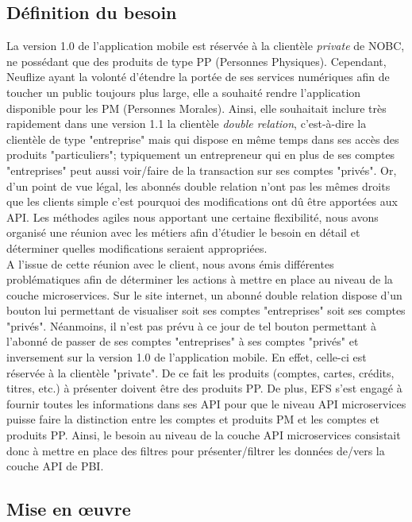\subsection{Définition du besoin}	
	
	La version 1.0 de l’application mobile est réservée à la clientèle \textit{private} de NOBC, ne possédant que des produits de type PP (Personnes Physiques). Cependant, Neuflize ayant la volonté d'étendre la portée de ses services numériques afin de toucher un public toujours plus large, elle a souhaité rendre l'application disponible pour les PM (Personnes Morales). Ainsi, elle souhaitait inclure très rapidement dans une version 1.1 la clientèle \textit{double relation}, c’est-à-dire la clientèle de type "entreprise" mais qui dispose en même temps dans ses accès des produits "particuliers"; typiquement un entrepreneur qui en plus de ses comptes "entreprises" peut aussi voir/faire de la transaction sur ses comptes "privés". Or, d'un point de vue légal, les abonnés double relation n'ont pas les mêmes droits que les clients simple c'est pourquoi des modifications ont dû être apportées aux API. Les méthodes agiles nous apportant une certaine flexibilité, nous avons organisé une réunion avec les métiers afin d'étudier le besoin en détail et déterminer quelles modifications seraient appropriées. \\
	
	A l'issue de cette réunion avec le client, nous avons émis différentes problématiques afin de déterminer les actions à mettre en place au niveau de la couche microservices. Sur le site internet, un abonné double relation dispose d’un bouton lui permettant de visualiser soit ses comptes "entreprises" soit ses comptes "privés". Néanmoins, il n’est pas prévu à ce jour de tel bouton permettant à l’abonné de passer de ses comptes "entreprises" à ses comptes "privés" et inversement sur la version 1.0 de l'application mobile. En effet, celle-ci est réservée à la clientèle "private". De ce fait les produits (comptes, cartes, crédits, titres, etc.) à présenter doivent être des produits PP. De plus, EFS s’est engagé à fournir toutes les informations dans ses API pour que le niveau API microservices puisse faire la distinction entre les comptes et produits PM et les comptes et produits PP. Ainsi, le besoin au niveau de la couche API microservices consistait donc à mettre en place des filtres pour présenter/filtrer les données de/vers la couche API de PBI.
	
\subsection{Mise en œuvre}
	
